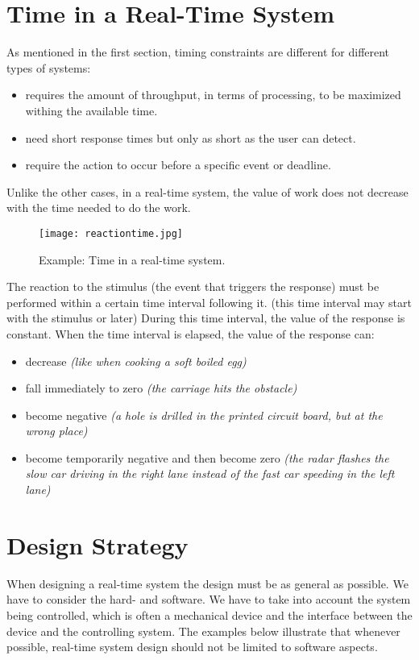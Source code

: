 \documentclass[../main.tex]{subfiles}
\begin{document}
\section{Time in a Real-Time System}
As mentioned in the first section, timing constraints are different for different types of systems:
\begin{itemize}
	\item {} requires the amount of throughput, in terms of processing, to be maximized withing the available time.
	\item {} need short response times but only as short as the user can detect.
	\item {} require the action to occur before a specific event or deadline.
\end{itemize}
Unlike the other cases, in a real-time system, the value of work does not decrease with the time needed to do the work. 

\begin{figure}[H]
    \centering
    \texttt{[image: reactiontime.jpg]}
    \caption{Example: Time in a real-time system.}
    \label{rttime}
\end{figure}
The reaction to the stimulus (the event that triggers the response) must be performed within a certain time interval following it. (this time interval may start with the stimulus or later) During this time interval, the value of the response is constant. When the time interval is elapsed, the value of the response can:
\begin{itemize}
	\item decrease \textit{(like when cooking a soft boiled egg)}
	\item fall immediately to zero \textit{(the carriage hits the obstacle)}
	\item become negative \textit{(a hole is drilled in the printed circuit board, but at the wrong place)}
	\item become temporarily negative and then become zero\textit{ (the radar flashes the slow car driving in the right lane instead of the fast car speeding in the left lane)}
\end{itemize}

\section{Design Strategy}
When designing a real-time system the design must be as general as possible. We have to consider the hard- and software. We have to take into account the system being controlled, which is often a mechanical device and the interface between the device and the controlling system. The examples below illustrate that whenever possible, real-time system design should not be limited to software aspects.
\end{document}
